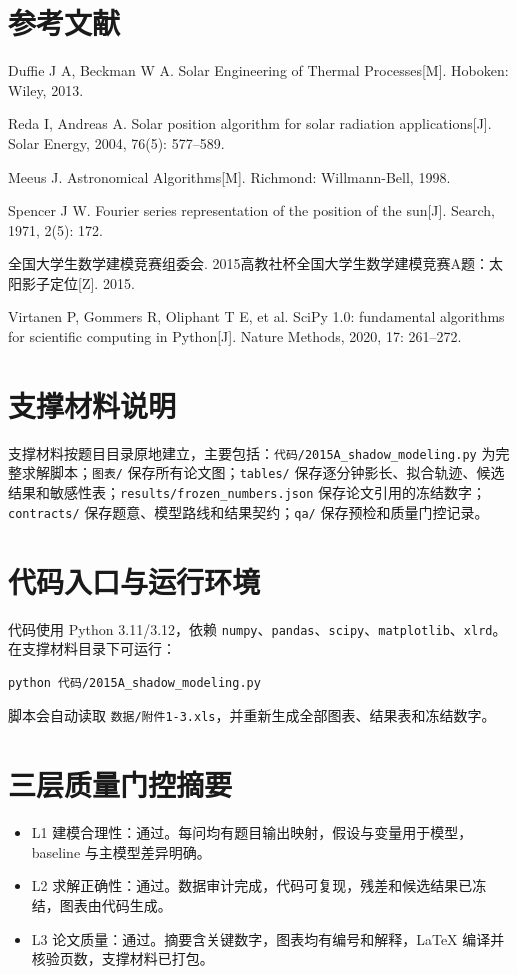 \documentclass[UTF8,a4paper,12pt]{ctexart}
\begin{document}
\section*{参考文献}
\begin{enumerate}[label={[\arabic*]}]
\item Duffie J A, Beckman W A. Solar Engineering of Thermal Processes[M]. Hoboken: Wiley, 2013.
\item Reda I, Andreas A. Solar position algorithm for solar radiation applications[J]. Solar Energy, 2004, 76(5): 577--589.
\item Meeus J. Astronomical Algorithms[M]. Richmond: Willmann-Bell, 1998.
\item Spencer J W. Fourier series representation of the position of the sun[J]. Search, 1971, 2(5): 172.
\item 全国大学生数学建模竞赛组委会. 2015高教社杯全国大学生数学建模竞赛A题：太阳影子定位[Z]. 2015.
\item Virtanen P, Gommers R, Oliphant T E, et al. SciPy 1.0: fundamental algorithms for scientific computing in Python[J]. Nature Methods, 2020, 17: 261--272.
\end{enumerate}

\appendix
\section{支撑材料说明}
支撑材料按题目目录原地建立，主要包括：\verb|代码/2015A_shadow_modeling.py| 为完整求解脚本；\verb|图表/| 保存所有论文图；\verb|tables/| 保存逐分钟影长、拟合轨迹、候选结果和敏感性表；\verb|results/frozen_numbers.json| 保存论文引用的冻结数字；\verb|contracts/| 保存题意、模型路线和结果契约；\verb|qa/| 保存预检和质量门控记录。

\section{代码入口与运行环境}
代码使用 Python 3.11/3.12，依赖 \verb|numpy|、\verb|pandas|、\verb|scipy|、\verb|matplotlib|、\verb|xlrd|。在支撑材料目录下可运行：
\begin{verbatim}
python 代码/2015A_shadow_modeling.py
\end{verbatim}
脚本会自动读取 \verb|数据/附件1-3.xls|，并重新生成全部图表、结果表和冻结数字。

\section{三层质量门控摘要}
\begin{itemize}
  \item L1 建模合理性：通过。每问均有题目输出映射，假设与变量用于模型，baseline 与主模型差异明确。
  \item L2 求解正确性：通过。数据审计完成，代码可复现，残差和候选结果已冻结，图表由代码生成。
  \item L3 论文质量：通过。摘要含关键数字，图表均有编号和解释，LaTeX 编译并核验页数，支撑材料已打包。
\end{itemize}
\end{document}
